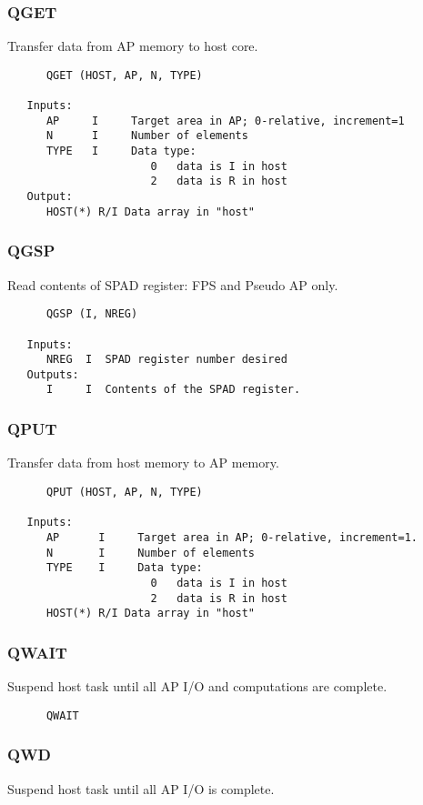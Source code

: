 \subsubsection{QGET }
Transfer data from AP memory to host core.

\begin{verbatim}
      QGET (HOST, AP, N, TYPE)

   Inputs:
      AP     I     Target area in AP; 0-relative, increment=1
      N      I     Number of elements
      TYPE   I     Data type:
                      0   data is I in host
                      2   data is R in host
   Output:
      HOST(*) R/I Data array in "host"

\end{verbatim}
\subsubsection{QGSP }
Read contents of SPAD register: FPS and Pseudo AP only.

\begin{verbatim}
      QGSP (I, NREG)

   Inputs:
      NREG  I  SPAD register number desired
   Outputs:
      I     I  Contents of the SPAD register.

\end{verbatim}
\subsubsection{QPUT }
Transfer data from host memory to AP memory.

\begin{verbatim}
      QPUT (HOST, AP, N, TYPE)

   Inputs:
      AP      I     Target area in AP; 0-relative, increment=1.
      N       I     Number of elements
      TYPE    I     Data type:
                      0   data is I in host
                      2   data is R in host
      HOST(*) R/I Data array in "host"

\end{verbatim}
\subsubsection{QWAIT }
Suspend host task until all AP I/O and computations are complete.

\begin{verbatim}
      QWAIT

\end{verbatim}
\subsubsection{QWD }
Suspend host task until all AP I/O is complete.


